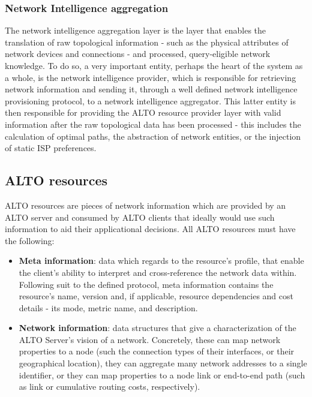 \subsubsection{Network Intelligence aggregation}

The network intelligence aggregation layer is the layer that enables the translation of raw topological information - such as the physical attributes of network devices and connections - and processed, query-eligible network knowledge. To do so, a very important entity, perhaps the heart of the system as a whole, is the network intelligence provider, which is responsible for retrieving network information and sending it, through a well defined network intelligence provisioning protocol, to a network intelligence aggregator. This latter entity is then responsible for providing the ALTO resource provider layer with valid information after the raw topological data has been processed - this includes the calculation of optimal paths, the abstraction of network entities, or the injection of static ISP preferences.


\subsection{ALTO resources}
\label{ssec:alto-resources}

ALTO resources are pieces of network information which are provided by an ALTO server and consumed by ALTO clients that ideally would use such information to aid their applicational decisions. All ALTO resources must have the following:

\begin{itemize}
        \item \textbf{Meta information}: data which regards to the resource's profile, that enable the client's ability to interpret and cross-reference the network data within. Following suit to the defined protocol, meta information contains the resource's name, version and, if applicable, resource dependencies and cost details - its mode, metric name, and description.
        \item \textbf{Network information}: data structures that give a characterization of the ALTO Server's vision of a network. Concretely, these can map network properties to a node (such the connection types of their interfaces, or their geographical location), they can aggregate many network addresses to a single identifier, or they can map properties to a node link or end-to-end path (such as link or cumulative routing costs, respectively).
\end{itemize}{}

